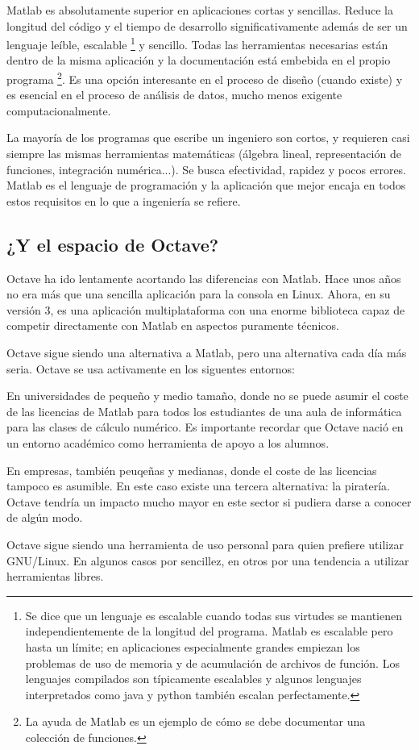 Matlab es absolutamente superior en aplicaciones cortas y sencillas.
Reduce la longitud del código y el tiempo de desarrollo
significativamente además de ser un lenguaje leíble, escalable%
\footnote{Se dice que un lenguaje es escalable cuando todas sus
  virtudes se mantienen independientemente de la longitud del
  programa. Matlab es escalable pero hasta un límite; en aplicaciones
  especialmente grandes empiezan los problemas de uso de memoria y de
  acumulación de archivos de función. Los lenguajes compilados son
  típicamente escalables y algunos lenguajes interpretados como java y
  python también escalan perfectamente.%
} y sencillo. Todas las herramientas necesarias están dentro de la
misma aplicación y la documentación está embebida en el propio
programa%
\footnote{La ayuda de Matlab es un ejemplo de cómo se debe documentar
  una colección de funciones.%
}. Es una opción interesante en el proceso de diseño (cuando existe) y
es esencial en el proceso de análisis de datos, mucho menos exigente
computacionalmente.

La mayoría de los programas que escribe un ingeniero son cortos, y
requieren casi siempre las mismas herramientas matemáticas (álgebra
lineal, representación de funciones, integración numérica...). Se
busca efectividad, rapidez y pocos errores. Matlab es el lenguaje de
programación y la aplicación que mejor encaja en todos estos
requisitos en lo que a ingeniería se refiere.


\subsection{¿Y el espacio de Octave?}

Octave ha ido lentamente acortando las diferencias con Matlab. Hace
unos años no era más que una sencilla aplicación para la consola en
Linux.  Ahora, en su versión 3, es una aplicación multiplataforma con
una enorme biblioteca capaz de competir directamente con Matlab en
aspectos puramente técnicos.

Octave sigue siendo una alternativa a Matlab, pero una alternativa
cada día más seria.  Octave se usa activamente en los siguentes
entornos:

\begin{itmize}
\item En universidades de pequeño y medio tamaño, donde no se puede
  asumir el coste de las licencias de Matlab para todos los
  estudiantes de una aula de informática para las clases de cálculo
  numérico.  Es importante recordar que Octave nació en un entorno
  académico como herramienta de apoyo a los alumnos.
\item En empresas, también peuqeñas y medianas, donde el coste de las
  licencias tampoco es asumible.  En este caso existe una tercera
  alternativa: la piratería. Octave tendría un impacto mucho mayor en
  este sector si pudiera darse a conocer de algún modo.
\item Octave sigue siendo una herramienta de uso personal para quien
  prefiere utilizar GNU/Linux.  En algunos casos por sencillez, en
  otros por una tendencia a utilizar herramientas libres.
\end{itmize}

